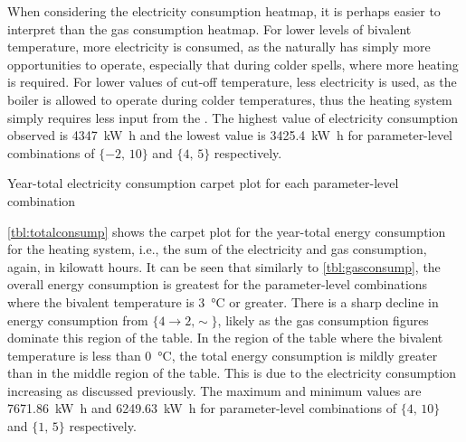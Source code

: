 When considering the electricity consumption heatmap, it is perhaps easier to interpret than the gas consumption heatmap. For lower levels of bivalent temperature, more electricity is consumed, as the \HP naturally has simply more opportunities to operate, especially that during colder spells, where more heating is required. For lower values of cut-off temperature, less electricity is used, as the boiler is allowed to operate during colder temperatures, thus the heating system simply requires less input from the \HP. The highest value of electricity consumption observed is \qty{4347}{\kilo\watt\hour} and the lowest value is \qty{3425.4}{\kilo\watt\hour} for parameter-level combinations of $\{-2\text{, }10\}$ and $\{4\text{, }5\}$ respectively. 

\begin{table}[htb]
    \footnotesize
    \centering
    \caption{Year-total electricity consumption carpet plot for each parameter-level combination}
    \label{tbl:elecconsump}
\end{table}

\cref{tbl:totalconsump} shows the carpet plot for the year-total energy consumption for the heating system, i.e., the sum of the electricity and gas consumption, again, in kilowatt hours. It can be seen that similarly to \cref{tbl:gasconsump}, the overall energy consumption is greatest for the parameter-level combinations where the bivalent temperature is \qty{3}{\celsius} or greater. There is a sharp decline in energy consumption from $\{4\rightarrow2\text{,}\sim\}$, likely as the gas consumption figures dominate this region of the table. In the region of the table where the bivalent temperature is less than \qty{0}{\celsius}, the total energy consumption is mildly greater than in the middle region of the table. This is due to the electricity consumption increasing as discussed previously. The maximum and minimum values are \qty{7671.86}{\kilo\watt\hour} and \qty{6249.63}{\kilo\watt\hour} for parameter-level combinations of $\{4\text{, }10\}$ and $\{1\text{, }5\}$ respectively. 

